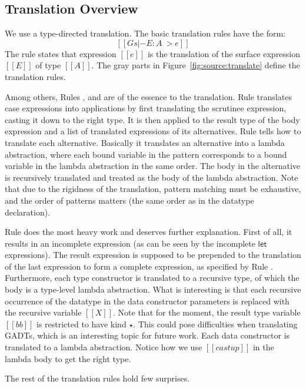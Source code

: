 \subsection{Translation Overview}

We use a type-directed translation. The basic translation rules have the form:
\[
[[Gs  |- E : A ~> e]]
\]
The rule states that \name expression $[[e]]$ is the translation of the
surface expression $[[E]]$ of type $[[A]]$.  The gray parts in
Figure~\ref{fig:source:translate} define the translation
rules. 

Among others, Rules ,  and
 are of the essence to the translation. Rule
 translates case expressions into applications by
first translating the scrutinee expression, casting it down to the
right type. It is then applied to the result type of the body
expression and a list of translated \name expressions of its
alternatives. Rule  tells how to translate each
alternative. Basically it translates an alternative into a lambda
abstraction, where each bound variable in the pattern corresponds to a
bound variable in the lambda abstraction in the same order. The body
in the alternative is recursively translated and treated as the body
of the lambda abstraction. Note that due to the rigidness of the
translation, pattern matching must be exhaustive, and the order of
patterns matters (the same order as in the datatype declaration).

Rule  does the most heavy work and deserves
further explanation. First of all, it results in an incomplete
expression (as can be seen by the incomplete $\mathsf{let}$
expressions). The result expression is supposed to be prepended to the
translation of the last expression to form a complete \name
expression, as specified by Rule . Furthermore,
each type constructor is translated to a recursive type, of which the
body is a type-level lambda abstraction. What is interesting is that
each recursive occurrence of the datatype in the data constructor
parameters is replaced with the recursive variable $[[X]]$. Note that
for the moment, the result type variable $[[bb]]$ is restricted to
have kind $\star$. This could pose difficulties when translating
GADTs, which is an interesting topic for future work. Each data constructor is
translated to a lambda abstraction. Notice how we use $[[castup]]$ in
the lambda body to get the right type.

The rest of the translation rules hold few surprises.

